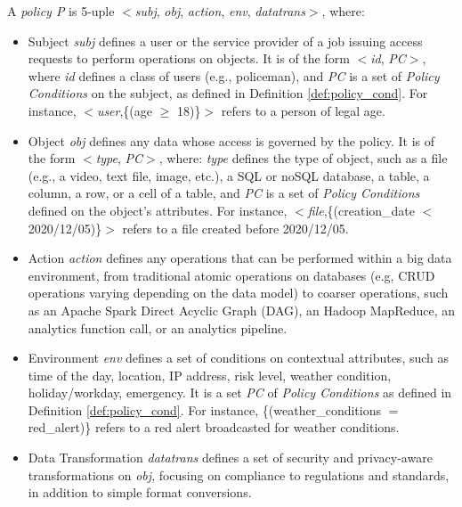 \begin{definition}[Policy]\label{def:policy_rule}
  A {\it policy P} is 5-uple $<$\textit{subj}, \textit{obj}, \textit{action}, \textit{env}, \textit{datatrans}$>$, where:
  \begin{itemize}
    \item Subject \textit{subj} defines a user or the service provider of a job issuing access requests to perform operations on objects. It is of the form $<$\emph{id}, \emph{PC}$>$, where \emph{id} defines a class of users (e.g., policeman), and \emph{PC} is a set of \emph{Policy Conditions} on the subject, as defined in Definition \ref{def:policy_cond}. For instance, $<$\emph{user},\{(age $\geq$ 18)\}$>$ refers to a person of legal age.

    \item Object \textit{obj} defines any data whose access is governed by the policy. It is of the form $<$\emph{type}, \emph{PC}$>$, where: \emph{type} defines the type of object, such as a file (e.g., a video, text file, image, etc.), a SQL or noSQL database, a table, a column, a row, or a cell of a table, and \emph{PC} is a set of \emph{Policy Conditions} defined on the object's attributes. For instance, $<$\emph{file},\{(creation\_date $<$ 2020/12/05)\}$>$ refers to a file created before 2020/12/05.

    \item Action \textit{action} defines any operations that can be performed within a big data environment, from traditional atomic operations on databases (e.g, CRUD operations varying depending on the data model) to coarser operations, such as an Apache Spark Direct Acyclic Graph (DAG), an Hadoop MapReduce, an analytics function call, or an analytics pipeline.

    \item Environment \textit{env} defines a set of conditions on contextual attributes, such as time of the day, location, IP address, risk level, weather condition, holiday/workday, emergency. It is a set \emph{PC} of
          \emph{Policy Conditions} as defined in Definition \ref{def:policy_cond}.
          For instance, \{(weather\_conditions $=$ red\_alert)\} refers to a red alert broadcasted for weather conditions.

    \item Data Transformation \textit{datatrans} defines a set of security and privacy-aware transformations on \textit{obj}, focusing on compliance to regulations and standards, in addition to simple format conversions.
  \end{itemize}
\end{definition}

